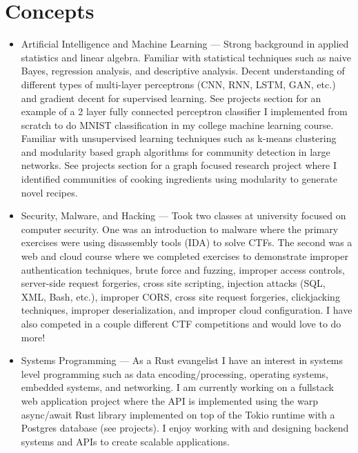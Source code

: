 \documentclass{article}
\begin{document}
\section{Concepts}
\begin{itemize}
      \item Artificial Intelligence and Machine Learning --- Strong background in applied statistics and linear algebra. Familiar with
         statistical techniques such as naive Bayes, regression analysis, and descriptive analysis. Decent understanding of different
         types of multi-layer perceptrons (CNN, RNN, LSTM, GAN, etc.) and gradient decent for supervised learning.
         See projects section for an example of a 2 layer
         fully connected perceptron classifier I implemented from scratch to do MNIST classification in my college machine learning course.
         Familiar with unsupervised learning techniques such as k-means clustering and modularity based graph algorithms for community
         detection in large networks. See projects section for a graph focused research project where I identified communities of cooking
         ingredients using modularity to generate novel recipes.
      \item Security, Malware, and Hacking --- Took two classes at university focused on computer security. One was an introduction to malware
         where the primary exercises were using disassembly tools (IDA) to solve CTFs. The second was a web and cloud course where we
         completed exercises to demonstrate improper authentication techniques, brute force and fuzzing, improper access controls,
         server-side request forgeries, cross site scripting, injection attacks (SQL, XML, Bash, etc.), improper CORS, cross site request
         forgeries, clickjacking techniques, improper deserialization, and improper cloud configuration. I have also competed in a couple
         different CTF competitions and would love to do more!
      \item Systems Programming --- As a Rust evangelist I have an interest in systems level programming such as data encoding/processing,
         operating systems, embedded systems, and networking. I am currently working on a fullstack web application project where the API
         is implemented using the warp async/await Rust library implemented on top of the Tokio runtime with a Postgres database (see projects).
         I enjoy working with and designing backend systems and APIs to create scalable applications.
\end{itemize}
\end{document}
